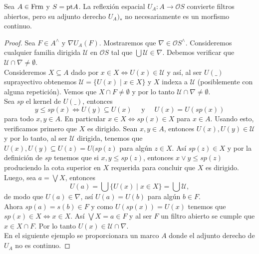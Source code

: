 \begin{thm}\label{Teorema7.2.5}
    Sea $A\in \mathrm{Frm}$ y $S=\mathrm{pt} A$. La reflexión espacial $U_A\colon A\to \mathcal{O}S$ convierte filtros abiertos, pero su adjunto derecho $U_A)_*$ no necesariamente es un morfismo continuo.
\end{thm}

\begin{proof}
    Sea $F\in A^\wedge$ y $\nabla U_A(F)$. Mostraremos que $\nabla\in \mathcal{O}S^\wedge$. Consideremos cualquier familia dirigida $\mathcal{U}$ en $\mathcal{O}S$ tal que $\bigcup\mathcal{U}\in \nabla$. Debemos verificar que $\mathcal{U}\cap \nabla\neq \emptyset$.\\

    Consideremos $X\subseteq A$ dado por $x\in X\Leftrightarrow U(x)\in \mathcal{U}$ y así, al ser $U( \_ )$ suprayectivo obtenemos $\mathcal{U}=\{U(x)\mid x\in X\}$ y $X$ indexa a $\mathcal{U}$ (posiblemente con alguna repetición). Vemos que $X\cap F\neq \emptyset$ y por lo tanto $\mathcal{U}\cap \nabla\neq \emptyset$.\\

    Sea $sp$ el kernel de $U( \_ )$, entonces
    \[
    y\leq sp(x)\Leftrightarrow U(y)\subseteq U(x)\quad \mbox{ y }\quad U(x)=U(sp(x))
    \]
    para todo $x, y \in A$. En particular $x\in X\Leftrightarrow sp(x)\in X$ para $x\in A$. Usando esto, verificamos primero que $X$ es dirigido. Sean $x, y\in A$, entonces $U(x), U(y)\in \mathcal{U}$ y por lo tanto, al ser $\mathcal{U}$ dirigida, tenemos que $U(x), U(y)\subseteq U(z)=U(sp(z)$ para algún $z\in X$. Así $sp(z)\in X$ y por la definición de $sp$ tenemos que si $x, y\leq sp(z)$, entonces $x\vee y\leq sp(z)$ produciendo la cota superior en $X$ requerida para concluir que $X$ es dirigido.\\

    Luego, sea $a=\bigvee X$, entonces 
    \[
    U(a)=\bigcup\{U(x)\mid x\in X\}=\bigcup \mathcal{U},
    \]
    de modo que $U(a)\in \nabla$, así $U(a)=U(b)$ para algún $b\in  F$.\\
    
    Ahora $sp(a)=s(b)\in F$ y como $U(sp(x))=U(x)$ tenemos que $sp(x)\in X\Leftrightarrow x\in X$. Así $\bigvee X=a\in F$ y al ser $F$ un filtro abierto se cumple que $x\in X\cap F$. Por lo tanto $U(x)\in \mathcal{U}\cap \nabla$.\\

    En el siguiente ejemplo se proporcionara un marco $A$ donde el adjunto derecho de $U_A$ no es continuo.
\end{proof}


